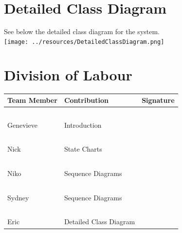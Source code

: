\documentclass[titlepage]{article}
\begin{document}
\section{Detailed Class Diagram}
See below the detailed class diagram for the system.\\

\bigskip
\texttt{[image: ../resources/DetailedClassDiagram.png]}\\


\newpage
\appendix
\section{Division of Labour}
\begin{center}
\begin{tabular}[!htbp]{| p{6cm} | p{6cm} | p{4cm} |} \hline
	\textbf{Team Member}	&\textbf{Contribution} 						& \textbf{Signature}	\\ \hline
	~					&~										&				\\
	Genevieve			&Introduction								&				\\ \hline
	~					&~										&				\\
	Nick					&State Charts								&				\\ \hline
	~					&										&				\\
	Niko					&Sequence Diagrams						&				\\ \hline
	~					&										&				\\
	Sydney				&Sequence Diagrams						&				\\ \hline
	~					&										&				\\
	Eric					&Detailed Class Diagram						&				\\ \hline
\end{tabular}
\end{center}
\end{document}
